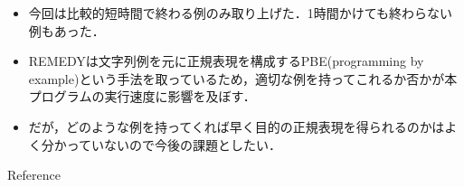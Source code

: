 \documentclass[uplatex,dvipdfmx,11pt,notheorems,aspectratio = 169]{beamer}
\theoremstyle{definition}
\begin{document}
\begin{frame}
  \begin{itemize}
    \item 今回は比較的短時間で終わる例のみ取り上げた．1時間かけても終わらない例もあった．
    \item REMEDYは文字列例を元に正規表現を構成するPBE(programming by example)という手法を取っているため，適切な例を持ってこれるか否かが本プログラムの実行速度に影響を及ぼす．
    \item だが，どのような例を持ってくれば早く目的の正規表現を得られるのかはよく分かっていないので今後の課題としたい．
  \end{itemize}
\end{frame}




\begin{frame}[allowframebreaks]{Reference}
  \scriptsize
  \beamertemplatetextbibitems
  
  
\end{frame}
\end{document}
